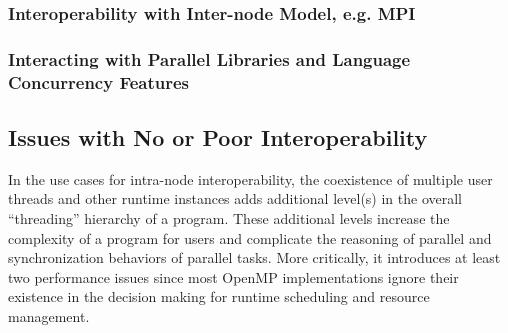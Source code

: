 %


\subsubsection{Interoperability with Inter-node Model, e.g. MPI}


\subsubsection{Interacting with Parallel Libraries and Language Concurrency Features}





\subsection{Issues with No or Poor Interoperability}
In the use cases for intra-node interoperability, 
the coexistence of multiple user threads and other runtime instances
adds additional level(s) in the overall ``threading''
hierarchy of a program. %
These additional levels increase the complexity of a program for 
users and complicate the reasoning of parallel and synchronization behaviors of parallel tasks. 
More critically, it introduces at least two performance issues
since most OpenMP implementations ignore their existence %
in the decision making for runtime scheduling and resource management. 

